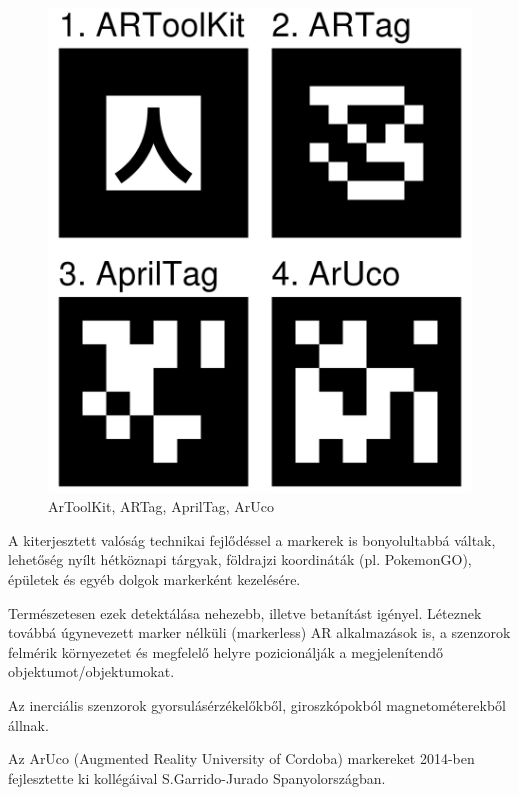\begin{figure}[htp]
    \centering
   	\includegraphics[width=3truecm, height=3truecm]{images/markerek.png}
	\caption{ArToolKit, ARTag, AprilTag, ArUco}
\end{figure}



A kiterjesztett valóság technikai fejlődéssel a markerek is bonyolultabbá váltak, lehetőség nyílt hétköznapi tárgyak, földrajzi koordináták (pl. PokemonGO), épületek és egyéb dolgok markerként kezelésére.

Természetesen ezek detektálása nehezebb, illetve betanítást igényel.
Léteznek továbbá úgynevezett marker nélküli (markerless) AR alkalmazások is, a szenzorok felmérik környezetet és megfelelő helyre pozicionálják a megjelenítendő objektumot/objektumokat. 

Az inerciális szenzorok gyorsulásérzékelőkből, giroszkópokból magnetométerekből állnak.




Az ArUco (Augmented Reality University of Cordoba) markereket 2014-ben fejlesztette ki kollégáival S.Garrido-Jurado Spanyolországban. 

